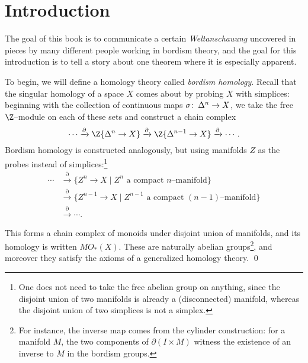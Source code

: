 
\setcounter{chapter}{-1}
\chapter{Introduction}

\label{IntroductionSection}

The goal of this book is to communicate a certain \textit{Weltanschauung} uncovered in pieces by many different people working in bordism theory, and the goal for this introduction is to tell a story about one theorem where it is especially apparent.

To begin, we will define a homology theory called \textit{bordism homology}.  Recall that the singular homology of a space \(X\) comes about by probing \(X\) with simplices: beginning with the collection of continuous maps \(\sigma\colon\thinspace \Delta^n \to X\), we take the free \(\Z\)--module on each of these sets and construct a chain complex \[\cdots \xrightarrow{\partial} \Z\{\Delta^n \to X\} \xrightarrow{\partial} \Z\{\Delta^{n-1} \to X\} \xrightarrow{\partial} \cdots.\]  Bordism homology is constructed analogously, but using manifolds \(Z\) as the probes instead of simplices:\footnote{One does not need to take the free abelian group on anything, since the disjoint union of two manifolds is already a (disconnected) manifold, whereas the disjoint union of two simplices is not a simplex.}
\begin{align*}
\cdots & \xrightarrow{\partial} \{Z^n \to X \mid \text{\(Z^n\) a compact \(n\)--manifold}\} \\
& \xrightarrow{\partial} \{Z^{n-1} \to X \mid \text{\(Z^{n-1}\) a compact \((n-1)\)--manifold}\} \\
& \xrightarrow{\partial} \cdots.
\end{align*}

\begin{lemma*}
This forms a chain complex of monoids under disjoint union of manifolds, and its homology is written \(MO_*(X)\).  These are naturally abelian groups\footnote{For instance, the inverse map comes from the cylinder construction: for a manifold \(M\), the two components of \(\partial(I \times M)\) witness the existence of an inverse to \(M\) in the bordism groups.}, and moreover they satisfy the axioms of a generalized homology theory. \qed
\end{lemma*}

